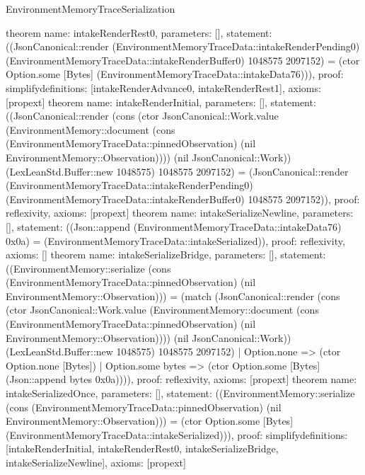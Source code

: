 \begin{lexlean}{EnvironmentMemoryTraceSerialization}
\begin{semanticmodule}
{}
theorem{
 name: intakeRenderRest0, parameters: [],
 statement: ((JsonCanonical::render (EnvironmentMemoryTraceData::intakeRenderPending0) (EnvironmentMemoryTraceData::intakeRenderBuffer0) 1048575 2097152) = (ctor Option.some [Bytes] (EnvironmentMemoryTraceData::intakeData76))), proof: simplify{definitions: [intakeRenderAdvance0, intakeRenderRest1]}, axioms: [propext]
}
theorem{
 name: intakeRenderInitial, parameters: [],
 statement: ((JsonCanonical::render (cons (ctor JsonCanonical::Work.value (EnvironmentMemory::document (cons (EnvironmentMemoryTraceData::pinnedObservation) (nil EnvironmentMemory::Observation)))) (nil JsonCanonical::Work)) (LexLeanStd.Buffer::new 1048575) 1048575 2097152) = (JsonCanonical::render (EnvironmentMemoryTraceData::intakeRenderPending0) (EnvironmentMemoryTraceData::intakeRenderBuffer0) 1048575 2097152)), proof: reflexivity{}, axioms: [propext]
}
theorem{
 name: intakeSerializeNewline, parameters: [],
 statement: ((Json::append (EnvironmentMemoryTraceData::intakeData76) 0x0a) = (EnvironmentMemoryTraceData::intakeSerialized)), proof: reflexivity{}, axioms: []
}
theorem{
 name: intakeSerializeBridge, parameters: [],
 statement: ((EnvironmentMemory::serialize (cons (EnvironmentMemoryTraceData::pinnedObservation) (nil EnvironmentMemory::Observation))) = (match (JsonCanonical::render (cons (ctor JsonCanonical::Work.value (EnvironmentMemory::document (cons (EnvironmentMemoryTraceData::pinnedObservation) (nil EnvironmentMemory::Observation)))) (nil JsonCanonical::Work)) (LexLeanStd.Buffer::new 1048575) 1048575 2097152) | Option.none => (ctor Option.none [Bytes]) | Option.some bytes => (ctor Option.some [Bytes] (Json::append bytes 0x0a)))), proof: reflexivity{}, axioms: [propext]
}
theorem{
 name: intakeSerializedOnce, parameters: [],
 statement: ((EnvironmentMemory::serialize (cons (EnvironmentMemoryTraceData::pinnedObservation) (nil EnvironmentMemory::Observation))) = (ctor Option.some [Bytes] (EnvironmentMemoryTraceData::intakeSerialized))), proof: simplify{definitions: [intakeRenderInitial, intakeRenderRest0, intakeSerializeBridge, intakeSerializeNewline]}, axioms: [propext]
}
\end{semanticmodule}
\end{lexlean}
